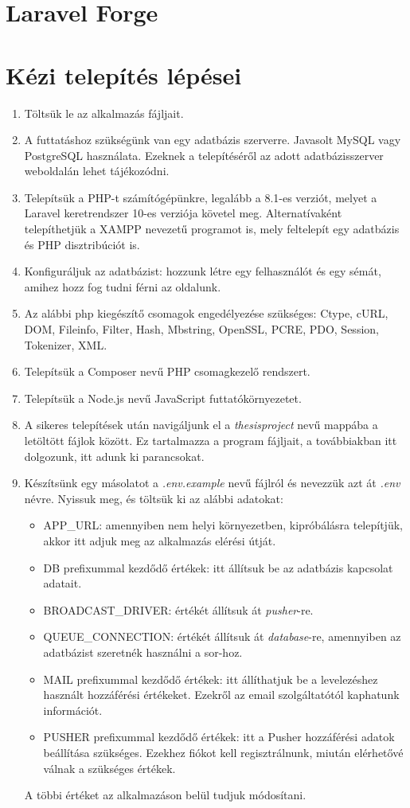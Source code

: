 \documentclass[
]{thesis-ekf}
\theoremstyle{definition}
\theoremstyle{remark}
\begin{document}
\section{Laravel Forge}
\section{Kézi telepítés lépései}
\begin{enumerate}
	\item Töltsük le az alkalmazás fájljait.
	\item A futtatáshoz szükségünk van egy adatbázis szerverre. Javasolt MySQL vagy PostgreSQL használata. Ezeknek a telepítéséről az adott adatbázisszerver weboldalán lehet tájékozódni.
	\item Telepítsük a PHP-t számítógépünkre, legalább a 8.1-es verziót, melyet a Laravel keretrendszer 10-es verziója követel meg. Alternatívaként telepíthetjük a XAMPP nevezetű programot is, mely feltelepít egy adatbázis és PHP disztribúciót is.
	\item Konfiguráljuk az adatbázist: hozzunk létre egy felhasználót és egy sémát, amihez hozz fog tudni férni az oldalunk.
	\item Az alábbi php kiegészítő csomagok engedélyezése szükséges: Ctype, cURL, DOM, Fileinfo, Filter, Hash, Mbstring, OpenSSL, PCRE, PDO, Session, Tokenizer, XML.
	\item Telepítsük a Composer nevű PHP csomagkezelő rendszert.
	\item Telepítsük a Node.js nevű JavaScript futtatókörnyezetet.
	\item A sikeres telepítések után navigáljunk el a \emph{thesisproject} nevű mappába a letöltött fájlok között. Ez tartalmazza a program fájljait, a továbbiakban itt dolgozunk, itt adunk ki parancsokat.
	\item Készítsünk egy másolatot a \emph{.env.example} nevű fájlról és nevezzük azt át \emph{.env} névre. Nyissuk meg, és töltsük ki az alábbi adatokat:
	\begin{itemize}
		\item APP\_URL: amennyiben nem helyi környezetben, kipróbálásra telepítjük, akkor itt adjuk meg az alkalmazás elérési útját.
		\item DB prefixummal kezdődő értékek: itt állítsuk be az adatbázis kapcsolat adatait.
		\item BROADCAST\_DRIVER: értékét állítsuk át \emph{pusher}-re.
		\item QUEUE\_CONNECTION: értékét állítsuk át \emph{database}-re, amennyiben az adatbázist szeretnék használni a sor-hoz.
		\item MAIL prefixummal kezdődő értékek: itt állíthatjuk be a levelezéshez használt hozzáférési értékeket. Ezekről az email szolgáltatótól kaphatunk információt.
		\item PUSHER prefixummal kezdődő értékek: itt a Pusher hozzáférési adatok beállítása szükséges. Ezekhez fiókot kell regisztrálnunk, miután elérhetővé válnak a szükséges értékek. 
	\end{itemize}
	A többi értéket az alkalmazáson belül tudjuk módosítani.


\end{enumerate}
\end{document}
